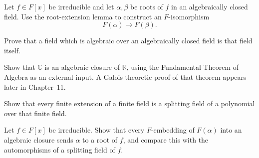 \begin{exercise}[Further] Let \(f\in F[x]\) be irreducible and let
\(\alpha,\beta\) be roots of \(f\) in an algebraically closed field.  Use the
root-extension lemma to construct an \(F\)-isomorphism
\[
F(\alpha)\longrightarrow F(\beta).
\]
\end{exercise}
\begin{exercise}[Further] Prove that a field which is algebraic over an
algebraically closed field is that field itself.
\end{exercise}
\begin{exercise}[Further] Show that \(\mathbb C\) is an algebraic closure of
\(\mathbb R\), using the Fundamental Theorem of Algebra as an external input.
A Galois-theoretic proof of that theorem appears later in Chapter~11.
\end{exercise}
\begin{exercise} Show that every finite extension of a finite
field is a splitting field of a polynomial over that finite field.
\end{exercise}
\begin{exercise} Let \(f\in F[x]\) be irreducible.  Show that
every \(F\)-embedding of \(F(\alpha)\) into an algebraic closure sends
\(\alpha\) to a root of \(f\), and compare this with the automorphisms of a
splitting field of \(f\).
\end{exercise}
